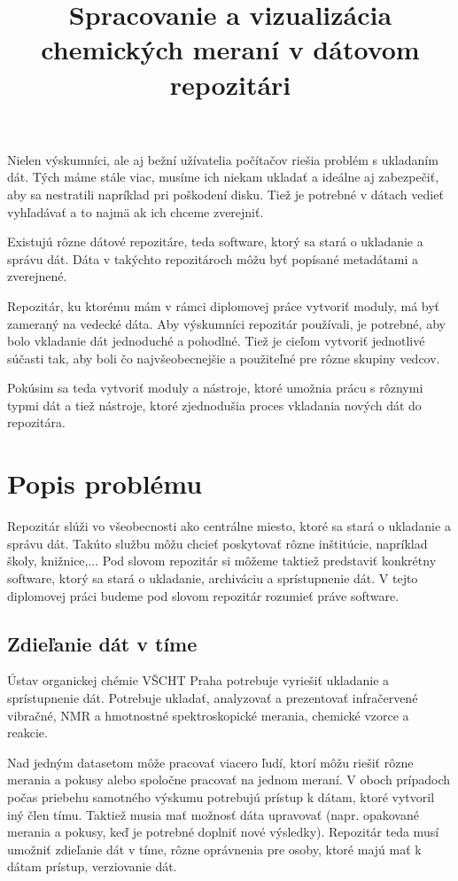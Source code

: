 \documentclass[thesis=M,slovak]{FITthesis}[2013/05/06]
\title{Spracovanie a vizualizácia chemických meraní v dátovom repozitári}
\begin{document}

\begin{introduction}
Nielen výskumníci, ale aj bežní užívatelia počítačov riešia problém s ukladaním dát. Tých máme stále viac, musíme ich niekam ukladať a ideálne aj zabezpečiť, aby sa nestratili napríklad pri poškodení disku. Tiež je potrebné v dátach vedieť vyhľadávať a to najmä ak ich chceme zverejniť. 

Existujú rôzne dátové repozitáre, teda software, ktorý sa stará o ukladanie a správu dát. Dáta v takýchto repozitároch môžu byť popísané metadátami a zverejnené.

Repozitár, ku ktorému mám v rámci diplomovej práce vytvoriť moduly, má byť zameraný na vedecké dáta. Aby výskumníci repozitár používali, je potrebné, aby bolo vkladanie dát jednoduché a pohodlné. Tiež je cieľom vytvoriť jednotlivé súčasti tak, aby boli čo najvšeobecnejšie a použiteľné pre rôzne skupiny vedcov.

Pokúsim sa teda vytvoriť moduly a nástroje, ktoré umožnia prácu s rôznymi typmi dát a tiež nástroje, ktoré zjednodušia proces vkladania nových dát do repozitára.
\end{introduction}

\chapter{Popis problému}
Repozitár slúži vo všeobecnosti ako centrálne miesto, ktoré sa stará o ukladanie a správu dát. Takúto službu môžu chcieť poskytovať rôzne inštitúcie, napríklad školy, knižnice,... Pod slovom repozitár si môžeme taktiež predstaviť konkrétny software, ktorý sa stará o ukladanie, archiváciu a sprístupnenie dát. V tejto diplomovej práci budeme pod slovom repozitár rozumieť práve software.

\section{Zdieľanie dát v tíme}
Ústav organickej chémie VŠCHT Praha potrebuje vyriešiť ukladanie a sprístupnenie dát. Potrebuje ukladať, analyzovať a prezentovať infračervené vibračné, NMR a hmotnostné spektroskopické merania, chemické vzorce a reakcie.

Nad jedným datasetom môže pracovať viacero ľudí, ktorí môžu riešiť rôzne merania a pokusy alebo spoločne pracovať na jednom meraní. V oboch prípadoch počas priebehu samotného výskumu potrebujú prístup k dátam, ktoré vytvoril iný člen tímu. Taktiež musia mať možnosť dáta upravovať (napr. opakované merania a pokusy, keď je potrebné doplniť nové výsledky). Repozitár teda musí umožniť zdieľanie dát v tíme, rôzne oprávnenia pre osoby, ktoré majú mať k dátam prístup, verziovanie dát.
\end{document}
